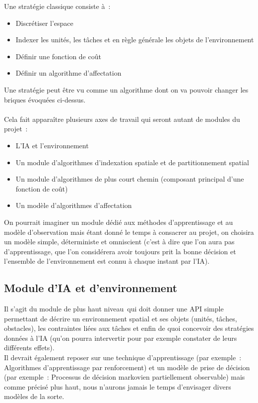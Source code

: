 Une stratégie classique consiste à~:
\begin{itemize}
\item Discrétiser l'espace
\item Indexer les unités, les tâches et en règle générale les objets de l'environnement
\item Définir une fonction de coût
\item Définir un algorithme d'affectation\\
\end{itemize}

Une stratégie peut être vu comme un algorithme dont on va pouvoir changer les briques évoquées ci-dessus.\\\\

Cela fait apparaître plusieurs axes de travail qui seront autant de modules du projet~:
\begin{itemize}
\item L'IA et l'environnement
\item Un module d'algorithmes d'indexation spatiale et  de partitionnement spatial
\item Un module d'algorithmes de plus court chemin (composant principal d'une fonction de coût)
\item Un modèle d'algorithmes d'affectation\\
\end{itemize}

On pourrait imaginer un module dédié aux méthodes d'apprentissage et au modèle d'observation mais étant donné le temps à consacrer au projet, on choisira un modèle simple, déterministe et omniscient (c'est à dire que l'on aura pas d'apprentissage, que l'on considérera avoir toujours prit la bonne décision et l'ensemble de l'environnement est connu à chaque instant par l'IA).

\subsection{Module d'IA et d'environnement}

Il s'agit du module de plus \og haut niveau\fg ~qui doit donner une API simple permettant de décrire un environnement spatial et ses objets (unités, tâches, obstacles), les contraintes liées aux tâches et enfin de quoi concevoir des stratégies données à l'IA (qu'on pourra intervertir pour par exemple constater de leurs différents effets).\\

Il devrait également reposer sur une technique d'apprentissage (par exemple~: Algorithmes d'apprentissage par renforcement)  et un modèle de prise de décision (par exemple~: Processus de décision markovien partiellement observable) mais comme précisé plus haut, nous n'aurons jamais le temps d'envisager divers modèles de la sorte.

